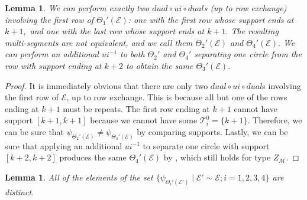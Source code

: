 \documentclass[11pt,letterpaper]{amsart}
\newcommand{\EE}{\mathcal{E}}
\newtheorem{lemma}[thm]{Lemma}
\numberwithin{equation}{section}
\begin{document}
\begin{lemma}
    We can perform exactly two $dual \circ ui \circ dual$s (up to row exchange) involving the first row of $\Theta_1'(\mathcal{E})$: one with the first row whose support ends at $k + 1,$ and one with the last row whose support ends at $k + 1.$ The resulting multi-segments are not equivalent, and we call them $\Theta_2'(\mathcal{E})$ and $\Theta_4'(\mathcal{E}).$ We can perform an additional $ui^{-1}$ to both $\Theta_2'$ and $\Theta_4'$ separating one circle from the row with support ending at $k + 2$ to obtain the same $\Theta_3'(\EE).$
\end{lemma}

\begin{proof}
    It is immediately obvious that there are only two $dual \circ ui \circ dual$s involving the first row of $\mathcal{E}$, up to row exchange. This is because all but one of the rows ending at $k + 1$ must be repeats. The first row ending at $k + 1$ cannot have support $[k + 1, k + 1]$ because we cannot have some $\mathcal{T}_i^0 = \{k + 1\}.$ Therefore, we can be sure that $\psi_{\Theta_2'(\mathcal{E})} \neq \psi_{\Theta_4'(\mathcal{E})}$ by comparing supports. Lastly, we can be sure that applying an additional $ui^{-1}$ to separate one circle with support $[k + 2, k + 2]$ produces the same $\Theta_4'(\mathcal{E})$ by \cite[Lemma 6.6]{HKT26}, which still holds for type $Z_{\mathcal{M}}.$
\end{proof}

\begin{lemma}
\label{thetas distinct case 3}
    All of the elements of the set $\{\psi_{\Theta_i'(\EE')} \mid \mathcal{E}' \sim \mathcal{E}; i = 1, 2, 3, 4 \}$ are distinct.
\end{lemma}
\end{document}
